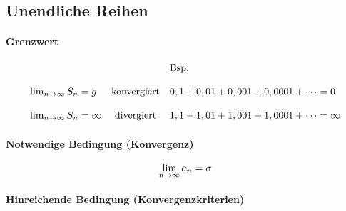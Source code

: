 \subsection{Unendliche Reihen}

\paragraph{Grenzwert}

\[
    \begin{array}{lcl}
        & & \text{Bsp.} \\
        \\
        \lim_{n \rightarrow{} \infty} S_n = g & \text{konvergiert} & 0,1 + 0,01 + 0,001 + 0,0001 + \cdots = 0 \\
        \\
        \lim_{n \rightarrow{} \infty} S_n = \infty & \text{divergiert} & 1,1 + 1,01 + 1,001 + 1,0001 + \cdots = \infty
    \end{array}
\]

\paragraph{Notwendige Bedingung (Konvergenz)}

\[
    \lim_{n \rightarrow{} \infty} a_n = \sigma    
\]

\paragraph{Hinreichende Bedingung (Konvergenzkriterien)}




